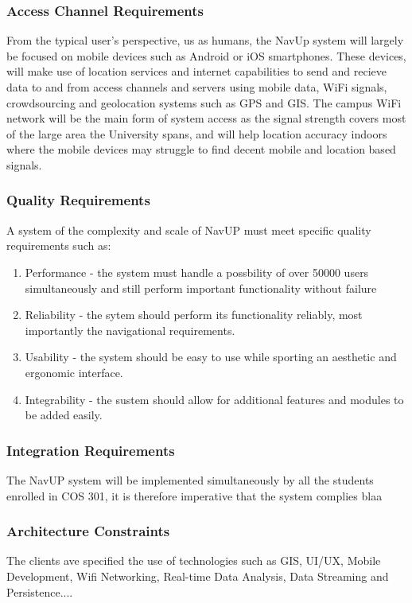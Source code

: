 \documentclass[12pt,a4paper]{report}
\begin{document}
			\subsubsection*{Access Channel Requirements}
				From the typical user's perspective, us as humans, the NavUp system will largely be focused on mobile devices such as Android or iOS smartphones.
				These devices, will make use of location services and internet capabilities to send and recieve data to and from access channels and servers using mobile data,
				WiFi signals, crowdsourcing and geolocation systems such as GPS and GIS. The campus WiFi network will be the main form of system access as the signal
				strength covers most of the large area the University spans, and will help location accuracy indoors where the mobile devices may struggle to find decent mobile
				and location based signals.
				
			\subsubsection*{Quality Requirements}
				A system of the complexity and scale of NavUP must meet specific quality requirements such as:
				
				\begin{enumerate}
				\renewcommand{\labelenumi}{{\textbf{\arabic{enumi}.}}}
				\item Performance - the system must handle a possbility of over 50000 users simultaneously and still perform important functionality without failure
				\item Reliability - the sytem should perform its functionality reliably, most importantly the navigational requirements.
				\item Usability - the system should be easy to use while sporting an aesthetic and ergonomic interface.
				\item Integrability - the sustem should allow for additional features and modules to be added easily.
				\end{enumerate}
				
			\subsubsection{Integration Requirements}
				The NavUP system will be implemented simultaneously by all the students enrolled in COS 301, it is therefore imperative that the system complies blaa %
			\subsubsection{Architecture Constraints}
				The clients ave specified the use of technologies such as GIS, UI/UX, Mobile Development, Wifi Networking, Real-time Data Analysis, Data Streaming and
				Persistence....
		
\end{document}
